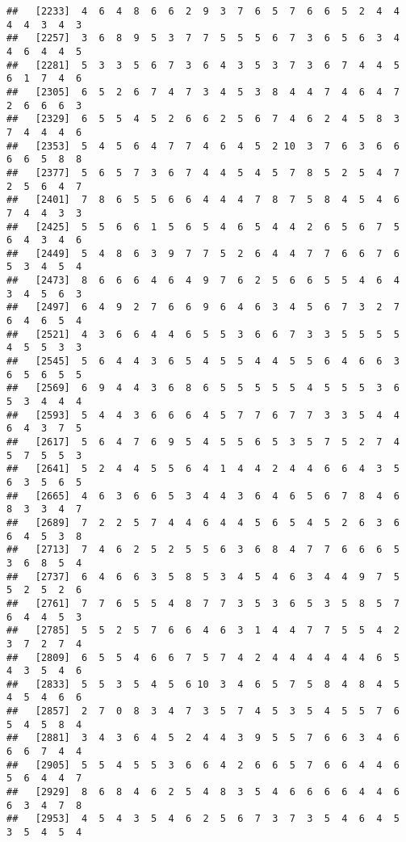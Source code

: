 \documentclass[
]{book}
\begin{document}
\begin{verbatim}
##   [2233]  4  6  4  8  6  6  2  9  3  7  6  5  7  6  6  5  2  4  4  4  4  3  4  3
##   [2257]  3  6  8  9  5  3  7  7  5  5  5  6  7  3  6  5  6  3  4  4  6  4  4  5
##   [2281]  5  3  3  5  6  7  3  6  4  3  5  3  7  3  6  7  4  4  5  6  1  7  4  6
##   [2305]  6  5  2  6  7  4  7  3  4  5  3  8  4  4  7  4  6  4  7  2  6  6  6  3
##   [2329]  6  5  5  4  5  2  6  6  2  5  6  7  4  6  2  4  5  8  3  7  4  4  4  6
##   [2353]  5  4  5  6  4  7  7  4  6  4  5  2 10  3  7  6  3  6  6  6  6  5  8  8
##   [2377]  5  6  5  7  3  6  7  4  4  5  4  5  7  8  5  2  5  4  7  2  5  6  4  7
##   [2401]  7  8  6  5  5  6  6  4  4  4  7  8  7  5  8  4  5  4  6  7  4  4  3  3
##   [2425]  5  5  6  6  1  5  6  5  4  6  5  4  4  2  6  5  6  7  5  6  4  3  4  6
##   [2449]  5  4  8  6  3  9  7  7  5  2  6  4  4  7  7  6  6  7  6  5  3  4  5  4
##   [2473]  8  6  6  6  4  6  4  9  7  6  2  5  6  6  5  5  4  6  4  3  4  5  6  3
##   [2497]  6  4  9  2  7  6  6  9  6  4  6  3  4  5  6  7  3  2  7  6  4  6  5  4
##   [2521]  4  3  6  6  4  4  6  5  5  3  6  6  7  3  3  5  5  5  5  4  5  5  3  3
##   [2545]  5  6  4  4  3  6  5  4  5  5  4  4  5  5  6  4  6  6  3  6  5  6  5  5
##   [2569]  6  9  4  4  3  6  8  6  5  5  5  5  5  4  5  5  5  3  6  5  3  4  4  4
##   [2593]  5  4  4  3  6  6  6  4  5  7  7  6  7  7  3  3  5  4  4  6  4  3  7  5
##   [2617]  5  6  4  7  6  9  5  4  5  5  6  5  3  5  7  5  2  7  4  5  7  5  5  3
##   [2641]  5  2  4  4  5  5  6  4  1  4  4  2  4  4  6  6  4  3  5  6  3  5  6  5
##   [2665]  4  6  3  6  6  5  3  4  4  3  6  4  6  5  6  7  8  4  6  8  3  3  4  7
##   [2689]  7  2  2  5  7  4  4  6  4  4  5  6  5  4  5  2  6  3  6  6  4  5  3  8
##   [2713]  7  4  6  2  5  2  5  5  6  3  6  8  4  7  7  6  6  6  5  3  6  8  5  4
##   [2737]  6  4  6  6  3  5  8  5  3  4  5  4  6  3  4  4  9  7  5  5  2  5  2  6
##   [2761]  7  7  6  5  5  4  8  7  7  3  5  3  6  5  3  5  8  5  7  6  4  4  5  3
##   [2785]  5  5  2  5  7  6  6  4  6  3  1  4  4  7  7  5  5  4  2  3  7  2  7  4
##   [2809]  6  5  5  4  6  6  7  5  7  4  2  4  4  4  4  4  4  6  5  4  3  5  4  6
##   [2833]  5  5  3  5  4  5  6 10  3  4  6  5  7  5  8  4  8  4  5  4  5  4  6  6
##   [2857]  2  7  0  8  3  4  7  3  5  7  4  5  3  5  4  5  5  7  6  5  4  5  8  4
##   [2881]  3  4  3  6  4  5  2  4  4  3  9  5  5  7  6  6  3  4  6  6  6  7  4  4
##   [2905]  5  5  4  5  5  3  6  6  4  2  6  6  5  7  6  6  4  4  6  5  6  4  4  7
##   [2929]  8  6  8  4  6  2  5  4  8  3  5  4  6  6  6  6  4  4  6  6  3  4  7  8
##   [2953]  4  5  4  3  5  4  6  2  5  6  7  3  7  3  5  4  6  4  5  3  5  4  5  4

\end{verbatim}
\end{document}
